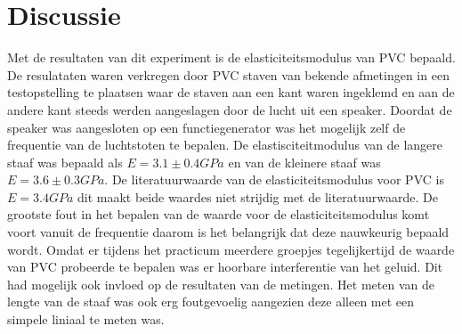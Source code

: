 \section{Discussie}
Met de resultaten van dit experiment is de elasticiteitsmodulus van PVC bepaald. De resulataten waren verkregen door PVC staven van bekende afmetingen in een testopstelling te plaatsen waar de staven aan een kant waren ingeklemd en aan de andere kant steeds werden aangeslagen door de lucht uit een speaker. Doordat de speaker was aangesloten op een functiegenerator was het mogelijk zelf de frequentie van de luchtstoten te bepalen. De elastisciteitmodulus van de langere staaf was bepaald als $E=3.1\pm0.4 GPa$ en van de kleinere staaf was $E=3.6\pm0.3 GPa$. De literatuurwaarde van de elasticiteitsmodulus voor PVC is $E=3.4 GPa$ dit maakt beide waardes niet strijdig met de literatuurwaarde. De grootste fout in het bepalen van de waarde voor de elasticiteitsmodulus komt voort vanuit de frequentie daarom is het belangrijk dat deze nauwkeurig bepaald wordt. Omdat er tijdens het practicum meerdere groepjes tegelijkertijd de waarde van PVC probeerde te bepalen was er hoorbare interferentie van het geluid. Dit had mogelijk ook invloed op de resultaten van de metingen. Het meten van de lengte van de staaf was ook erg foutgevoelig aangezien deze alleen met een simpele liniaal te meten was.